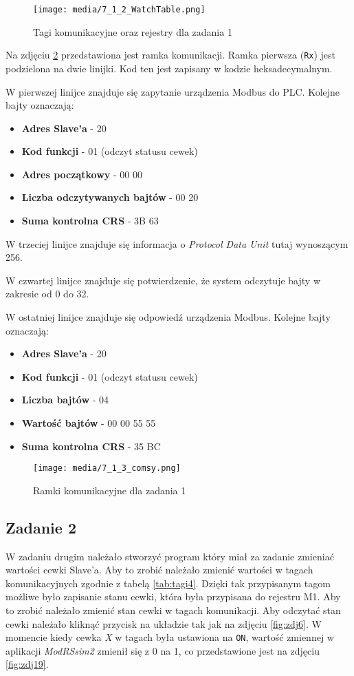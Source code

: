 \documentclass{article}
\begin{document}
\begin{figure}[H]
    \centering
    \texttt{[image: media/7\_1\_2\_WatchTable.png]}
    \caption{Tagi komunikacyjne oraz rejestry dla zadania 1}
    \label{fig:zdj17}
\end{figure}

\newpage
Na zdjęciu \ref{fig:zdj18} przedstawiona jest ramka komunikacji. Ramka pierwsza (\texttt{Rx}) jest podzielona na dwie linijki. Kod ten jest zapisany w kodzie heksadecymalnym. 

W pierwszej linijce znajduje się zapytanie urządzenia Modbus do PLC. Kolejne bajty oznaczają:
\begin{itemize}
    \item \textbf{Adres Slave'a} - 20
    \item \textbf{Kod funkcji} - 01 (odczyt statusu cewek)
    \item \textbf{Adres początkowy} - 00 00
    \item \textbf{Liczba odczytywanych bajtów} - 00 20
    \item \textbf{Suma kontrolna CRS} - 3B 63
\end{itemize}

W trzeciej linijce znajduje się informacja o \textit{Protocol Data Unit} tutaj wynoszącym 256.

W czwartej linijce znajduje się potwierdzenie, że system odczytuje bajty w zakresie od 0 do 32.

W ostatniej linijce znajduje się odpowiedź urządzenia Modbus. Kolejne bajty oznaczają:
\begin{itemize}
    \item \textbf{Adres Slave'a} - 20
    \item \textbf{Kod funkcji} - 01 (odczyt statusu cewek)
    \item \textbf{Liczba bajtów} - 04 
    \item \textbf{Wartość bajtów} - 00 00 55 55
    \item \textbf{Suma kontrolna CRS} - 35 BC
\end{itemize}



\begin{figure}[H]
    \centering
    \texttt{[image: media/7\_1\_3\_comsy.png]}
    \caption{Ramki komunikacyjne dla zadania 1}
    \label{fig:zdj18}
\end{figure}
\newpage
\subsection{Zadanie 2}
W zadaniu drugim należało stworzyć program który miał za zadanie zmieniać wartości cewki Slave'a. Aby to zrobić należało zmienić wartości w tagach komunikacyjnych zgodnie z tabelą \ref{tab:tagi4}. Dzięki tak przypisanym tagom możliwe było zapisanie stanu cewki, która była przypisana do rejestru M1. Aby to zrobić należało zmienić stan cewki w tagach komunikacji. Aby odczytać stan cewki należało kliknąć przycisk na układzie tak jak na zdjęciu \ref{fig:zdj6}. W momencie kiedy cewka \textit{X} w tagach była ustawiona na \texttt{ON}, wartość zmiennej w aplikacji \textit{ModRSsim2} zmienił się z 0 na 1, co przedstawione jest na zdjęciu \ref{fig:zdj19}.
\end{document}
